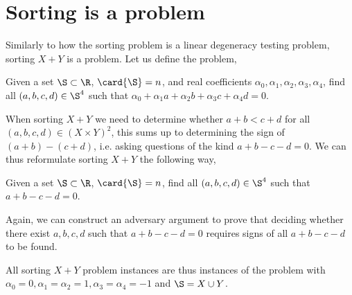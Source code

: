 \section{Sorting \XY is a \fourLDT problem}
\label{tree:related:xy4ldt}

Similarly to how the sorting problem is a linear degeneracy testing problem,
sorting $X+Y$ is a \fourLDT problem. Let us define the \fourLDT problem,

\begin{problem}
Given a set $\S \subset \R$, $\card{\S} = n$, and real coefficients $\alpha_0,
\alpha_1, \alpha_2, \alpha_3, \alpha_4$, find all $(a,b,c,d) \in \S^4$ such that
$\alpha_0 + \alpha_1 a + \alpha_2 b + \alpha_3 c + \alpha_4 d = 0$.
\end{problem}

When sorting $X+Y$ we need to determine whether $a + b < c + d$ for all
$(a,b,c,d) \in (X \times Y)^2$, this sums up to determining the sign of $(a+b) -
(c+d)$, i.e. asking questions of the kind $a + b - c - d = 0$. We can thus
reformulate sorting $X+Y$ the following way,

\begin{problem}
Given a set $\S \subset \R$, $\card{\S} = n$, find all $(a,b,c,d) \in \S^4$ such
that $a + b - c - d = 0$.
\end{problem}

Again, we can construct an adversary argument to prove that deciding whether
there exist \(a,b,c,d\) such that \(a+b-c-d=0\) requires signs of all
\(a+b-c-d\) to be found.

All sorting $X+Y$ problem instances are thus instances of the \fourLDT problem
with $\alpha_0 = 0, \alpha_1 = \alpha_2 = 1, \alpha_3 = \alpha_4 = -1$ and
$\S = X \cup Y$.

